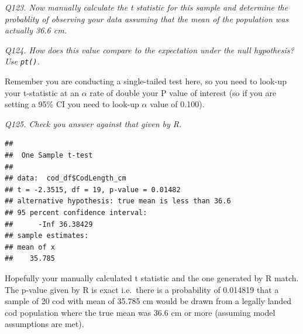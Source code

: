 \documentclass[
  11pt,
  a4paper,
]{book}
\newenvironment{Shaded}{\begin{snugshade}}{\end{snugshade}}
\newcommand{\AttributeTok}[1]{\textcolor[rgb]{0.77,0.63,0.00}{#1}}
\newcommand{\ConstantTok}[1]{\textcolor[rgb]{0.00,0.00,0.00}{#1}}
\newcommand{\FloatTok}[1]{\textcolor[rgb]{0.00,0.00,0.81}{#1}}
\newcommand{\FunctionTok}[1]{\textcolor[rgb]{0.00,0.00,0.00}{#1}}
\newcommand{\NormalTok}[1]{#1}
\newcommand{\OtherTok}[1]{\textcolor[rgb]{0.56,0.35,0.01}{#1}}
\newcommand{\SpecialCharTok}[1]{\textcolor[rgb]{0.00,0.00,0.00}{#1}}
\newcommand{\StringTok}[1]{\textcolor[rgb]{0.31,0.60,0.02}{#1}}
\begin{document}
\emph{Q123. Now manually calculate the t statistic for this sample and determine the probablity of observing your data assuming that the mean of the population was actually 36.6 cm.}

\begin{Shaded}
\end{Shaded}

\emph{Q124. How does this value compare to the expectation under the null hypothesis? Use \texttt{pt()}.}

Remember you are conducting a single-tailed test here, so you need to look-up your t-statistic at an \(\alpha\) rate of double your P value of interest (so if you are setting a 95\% CI you need to look-up \(\alpha\) value of 0.100).

\emph{Q125. Check you answer against that given by R.}

\begin{Shaded}
\end{Shaded}

\begin{verbatim}
## 
##  One Sample t-test
## 
## data:  cod_df$CodLength_cm
## t = -2.3515, df = 19, p-value = 0.01482
## alternative hypothesis: true mean is less than 36.6
## 95 percent confidence interval:
##      -Inf 36.38429
## sample estimates:
## mean of x 
##    35.785
\end{verbatim}

Hopefully your manually calculated t statistic and the one generated by R match. The p-value given by R is exact i.e.~there is a probability of 0.014819 that a sample of 20 cod with mean of 35.785 cm would be drawn from a legally landed cod population where the true mean was 36.6 cm or more (assuming model assumptions are met).
\end{document}
